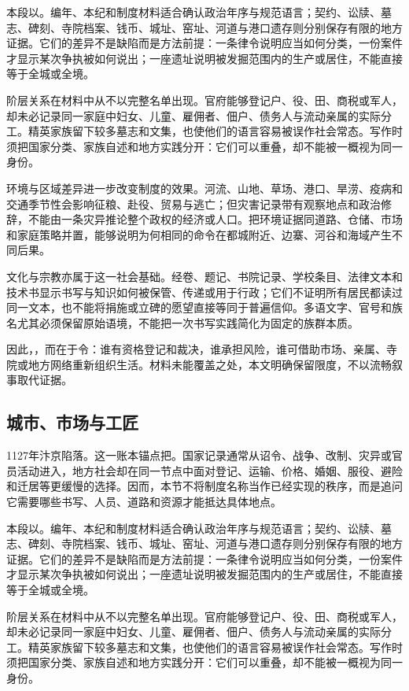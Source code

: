本段以。编年、本纪和制度材料适合确认政治年序与规范语言；契约、讼牍、墓志、碑刻、寺院档案、钱币、城址、窑址、河道与港口遗存则分别保存有限的地方证据。它们的差异不是缺陷而是方法前提：一条律令说明应当如何分类，一份案件才显示某次争执被如何说出；一座遗址说明被发掘范围内的生产或居住，不能直接等于全城或全境。

阶层关系在材料中从不以完整名单出现。官府能够登记户、役、田、商税或军人，却未必记录同一家庭中妇女、儿童、雇佣者、佃户、债务人与流动亲属的实际分工。精英家族留下较多墓志和文集，也使他们的语言容易被误作社会常态。写作时须把国家分类、家族自述和地方实践分开：它们可以重叠，却不能被一概视为同一身份。

环境与区域差异进一步改变制度的效果。河流、山地、草场、港口、旱涝、疫病和交通季节性会影响征粮、赴役、贸易与逃亡；但灾害记录带有观察地点和政治修辞，不能由一条灾异推论整个政权的经济或人口。把环境证据同道路、仓储、市场和家庭策略并置，能够说明为何相同的命令在都城附近、边寨、河谷和海域产生不同后果。

文化与宗教亦属于这一社会基础。经卷、题记、书院记录、学校条目、法律文本和技术书显示书写与知识如何被保管、传递或用于行政；它们不证明所有居民都读过同一文本，也不能将捐施或立碑的愿望直接等同于普遍信仰。多语文字、官号和族名尤其必须保留原始语境，不能把一次书写实践简化为固定的族群本质。

因此，，而在于令：谁有资格登记和裁决，谁承担风险，谁可借助市场、亲属、寺院或地方网络重新组织生活。材料未能覆盖之处，本文明确保留限度，不以流畅叙事取代证据。

\subsection{城市、市场与工匠}

1127年汴京陷落。这一账本锚点把。国家记录通常从诏令、战争、改制、灾异或官员活动进入，地方社会却在同一节点中面对登记、运输、价格、婚姻、服役、避险和迁居等更缓慢的选择。因而，本节不将制度名称当作已经实现的秩序，而是追问它需要哪些书写、人员、道路和资源才能抵达具体地点。

本段以。编年、本纪和制度材料适合确认政治年序与规范语言；契约、讼牍、墓志、碑刻、寺院档案、钱币、城址、窑址、河道与港口遗存则分别保存有限的地方证据。它们的差异不是缺陷而是方法前提：一条律令说明应当如何分类，一份案件才显示某次争执被如何说出；一座遗址说明被发掘范围内的生产或居住，不能直接等于全城或全境。

阶层关系在材料中从不以完整名单出现。官府能够登记户、役、田、商税或军人，却未必记录同一家庭中妇女、儿童、雇佣者、佃户、债务人与流动亲属的实际分工。精英家族留下较多墓志和文集，也使他们的语言容易被误作社会常态。写作时须把国家分类、家族自述和地方实践分开：它们可以重叠，却不能被一概视为同一身份。

